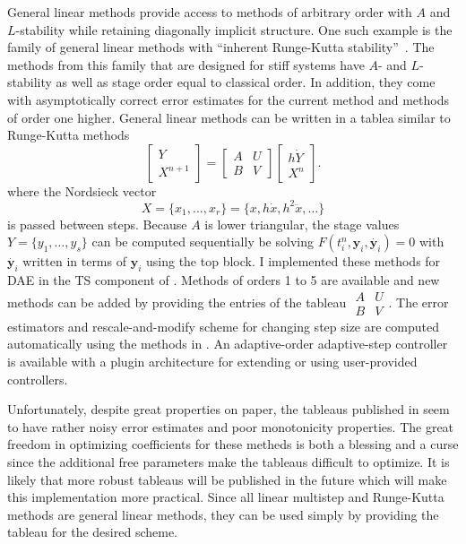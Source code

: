 General linear methods provide access to methods of arbitrary order with $A$ and $L$-stability while retaining diagonally implicit structure.
One such example is the family of general linear methods with ``inherent Runge-Kutta stability''~\citep{wright2002general,butcher2006general}.
The methods from this family that are designed for stiff systems have $A$- and $L$-stability as well as stage order equal to classical order.
In addition, they come with asymptotically correct error estimates for the current method and methods of order one higher.
General linear methods can be written in a tablea similar to Runge-Kutta methods
\begin{equation*}
  \begin{bmatrix} Y \\ X^{n+1} \end{bmatrix}
  = \begin{bmatrix} A & U \\ B & V \end{bmatrix}
  \begin{bmatrix} h \dot{Y} \\ X^{n} \end{bmatrix} .
\end{equation*}
where the Nordsieck vector
\begin{equation*}
  X = \{x_1,\dotsc,x_r\} = \{x, h \dot{x}, h^2 \ddot{x}, \dotsc \}
\end{equation*}
is passed between steps.
Because $A$ is lower triangular, the stage values $Y = \{ y_1,\dotsc,y_s \}$ can be computed sequentially be solving $F(t^n_i,\bm{y}_i,\dot{\bm{y}_i}) = 0$ with $\dot{\bm{y}_i}$ written in terms of $\bm{y}_i$ using the top block.
I implemented these methods for DAE in the TS component of {\PETSc}.
Methods of orders 1 to 5 are available and new methods can be added by providing the entries of the tableau $\begin{smallmatrix}A & U \\ B & V\end{smallmatrix}$.
The error estimators and rescale-and-modify scheme for changing step size are computed automatically using the methods in \citet{butcher2007error}.
An adaptive-order adaptive-step controller is available with a plugin architecture for extending or using user-provided controllers.

Unfortunately, despite great properties on paper, the tableaus published in \citet{butcher2006error,podhaisky2006atlas} seem to have rather noisy error estimates and poor monotonicity properties.
The great freedom in optimizing coefficients for these metheds is both a blessing and a curse since the additional free parameters make the tableaus difficult to optimize.
It is likely that more robust tableaus will be published in the future which will make this implementation more practical.
Since all linear multistep and Runge-Kutta methods are general linear methods, they can be used simply by providing the tableau for the desired scheme.

